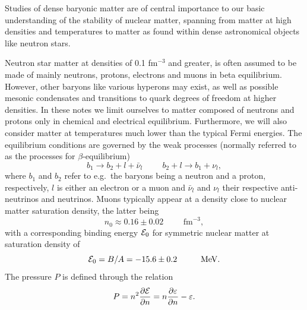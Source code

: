 Studies of dense baryonic matter are of central importance to our
basic understanding of the stability of nuclear matter, spanning from
matter at high densities and temperatures to matter as found within
dense astronomical objects like neutron stars.

Neutron star matter at densities of 0.1 fm$^{-3}$ and greater, is
often assumed to be made of mainly neutrons, protons, electrons and
muons in beta equilibrium. However, other baryons like various
hyperons may exist, as well as possible mesonic condensates and
transitions to quark degrees of freedom at higher densities.  In these notes we limit ourselves to
matter composed of neutrons and protons only in 
chemical and electrical equilibrium.  Furthermore, we will also
consider matter at temperatures much lower than the typical Fermi
energies.  The equilibrium conditions are governed by the weak
processes (normally referred to as the processes for
$\beta$-equilibrium)
\begin{equation} 
      b_1 \rightarrow b_2 + l +\bar{\nu}_l \hspace{1cm} b_2 +l \rightarrow b_1 
+\nu_l,
      \label{eq:betadecay}
\end{equation}
where $b_1$ and $b_2$ refer to e.g.\  the baryons being a neutron and a proton, 
respectively, 
$l$ is either an electron or a muon and  $\bar{\nu}_l $
and $\nu_l$ their respective anti-neutrinos and neutrinos. Muons typically 
appear at
a density close to nuclear matter saturation density, the latter being
\[
     n_0 \approx 0.16 \pm 0.02 \hspace{1cm} \mathrm{fm}^{-3},
\]
with a corresponding binding energy ${\cal E}_0$ 
for symmetric nuclear matter at saturation density of
\[
     {\cal E}_0 = B/A=-15.6\pm 0.2 \hspace{1cm} \mathrm{MeV}.
\]
The
pressure $P$ is defined through the relation
\begin{equation}
    P=n^2\frac{\partial {\cal E}}{\partial n}=
      n\frac{\partial \varepsilon}{\partial n}-\varepsilon.
\end{equation}

